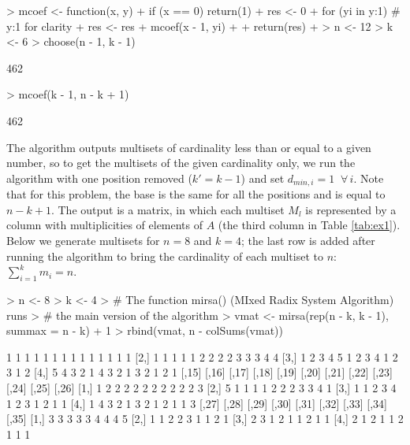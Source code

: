 \documentclass[12pt]{article}
\begin{document}
\begin{Schunk}
\begin{Sinput}
> mcoef <- function(x, y) {
+   if (x == 0) return(1)
+   res <- 0
+   for (yi in y:1) {                     # y:1 for clarity
+     res <- res + mcoef(x - 1, yi)
+   }
+   return(res)
+ }
> n <- 12
> k <- 6
> choose(n - 1, k - 1)
\end{Sinput}
\begin{Soutput}
[1] 462
\end{Soutput}
\begin{Sinput}
> mcoef(k - 1, n - k + 1)
\end{Sinput}
\begin{Soutput}
[1] 462
\end{Soutput}
\end{Schunk}

The algorithm outputs multisets of cardinality less than or equal to a given number, so to get the multisets of the given cardinality only, we run the algorithm with one position removed ($k' = k - 1$) and set $d_{min, i} = 1 \;\; \forall \, i$. Note that for this problem, the base is the same for all the positions and is equal to $n - k + 1$. The output is a matrix, in which each multiset $M_l$ is represented by a column with multiplicities of elements of $A$ (the third column in Table \ref{tab:ex1}). Below we generate multisets for $n = 8$ and $k = 4$; the last row is added after running the algorithm to bring the cardinality of each multiset to $n$: $\sum_{i = 1}^k m_i = n$.

\begin{Schunk}
\begin{Sinput}
> n <- 8
> k <- 4
> # The function mirsa() (MIxed Radix System Algorithm) runs 
> # the main version of the algorithm 
> vmat <- mirsa(rep(n - k, k - 1), summax = n - k) + 1
> rbind(vmat, n - colSums(vmat))
\end{Sinput}
\begin{Soutput}
     [,1] [,2] [,3] [,4] [,5] [,6] [,7] [,8] [,9] [,10] [,11] [,12] [,13] [,14]
[1,]    1    1    1    1    1    1    1    1    1     1     1     1     1     1
[2,]    1    1    1    1    1    2    2    2    2     3     3     3     4     4
[3,]    1    2    3    4    5    1    2    3    4     1     2     3     1     2
[4,]    5    4    3    2    1    4    3    2    1     3     2     1     2     1
     [,15] [,16] [,17] [,18] [,19] [,20] [,21] [,22] [,23] [,24] [,25] [,26]
[1,]     1     2     2     2     2     2     2     2     2     2     2     3
[2,]     5     1     1     1     1     2     2     2     3     3     4     1
[3,]     1     1     2     3     4     1     2     3     1     2     1     1
[4,]     1     4     3     2     1     3     2     1     2     1     1     3
     [,27] [,28] [,29] [,30] [,31] [,32] [,33] [,34] [,35]
[1,]     3     3     3     3     3     4     4     4     5
[2,]     1     1     2     2     3     1     1     2     1
[3,]     2     3     1     2     1     1     2     1     1
[4,]     2     1     2     1     1     2     1     1     1
\end{Soutput}
\end{Schunk}
\end{document}
